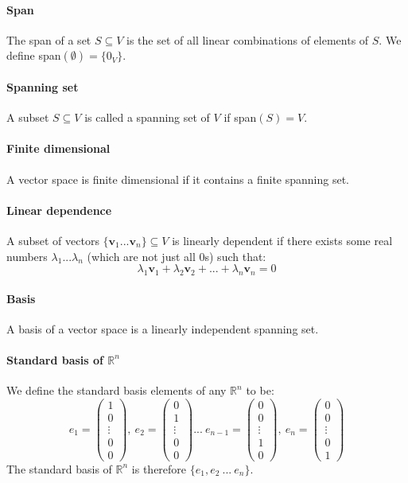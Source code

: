 \documentclass{article}
\newcommand{\R}{\mathbb{R}}
\renewcommand{\vec}[1]{\mathbf{#1}}
\begin{document}
\paragraph{Span}
The span of a set $ S \subseteq V $ is the set of all linear combinations of elements of $ S $. We define span$ (\emptyset) = \{0_{V}\} $.
\paragraph{Spanning set}
A subset $ S \subseteq V $ is called a spanning set of $ V $ if span$ (S) = V $.
\paragraph{Finite dimensional}
A vector space is finite dimensional if it contains a finite spanning set.
\paragraph{Linear dependence}
A subset of vectors $ \{ \vec{v}_{1}...\vec{v}_{n} \}  \subseteq V $ is linearly dependent if there exists some real numbers $ \lambda_{1}...\lambda_{n} $ (which are not just all $ 0 $s) such that:
\begin{equation}
\lambda_{1}\vec{v}_{1} + \lambda_{2}\vec{v}_{2} + ... + \lambda_{n}\vec{v}_{n} = 0
\end{equation}
\paragraph{Basis}
A basis of a vector space is a linearly independent spanning set.
\paragraph{Standard basis of $ \R^{n} $}
We define the standard basis elements of any $ \R^{n} $ to be:
\begin{equation}
e_{1} = 
\begin{pmatrix}
1 \\ 0 \\ \vdots \\ 0 \\ 0
\end{pmatrix} , \ 
e_{2} = 
\begin{pmatrix}
0 \\ 1 \\ \vdots \\ 0 \\ 0
\end{pmatrix} ... \
e_{n-1} = 
\begin{pmatrix}
0 \\ 0 \\ \vdots \\ 1 \\ 0
\end{pmatrix} , \
e_{n} = 
\begin{pmatrix}
0 \\ 0 \\ \vdots \\ 0 \\ 1
\end{pmatrix}
\end{equation}
The standard basis of $ \R^{n} $ is therefore $ \{e_{1}, e_{2} \ ... \ e_{n} \} $.
\end{document}
